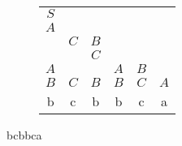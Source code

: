 \documentclass{article}
\begin{document}
\section{}
\begin{figure}[!h]
  \begin{subfigure}[h]{0.4\textwidth}
    \centering
    \begin{tabular}{|*6{c|}}
    \cline{1-1}
    $S$&\multicolumn{4}{c}{}\\
    \cline{1-2}
    $A$&&\multicolumn{3}{c}{}\\
    \cline{1-3}
    &$C$&$B$&\multicolumn{2}{c}{}\\
    \cline{1-4}
    &&$C$&&\multicolumn{1}{c}{}\\
    \cline{1-5}
    $A$&&&$A$&$B$\\
    \cline{1-6}
    $B$&$C$&$B$&$B$&$C$&$A$\\
    \hline
    b&c&b&b&c&a\\
    \end{tabular}
  \end{subfigure}
  \hfill
  \begin{subfigure}[h]{0.4\textwidth}
    \centering
  \end{subfigure}
  \caption{bcbbca}
\end{figure}
\end{document}
